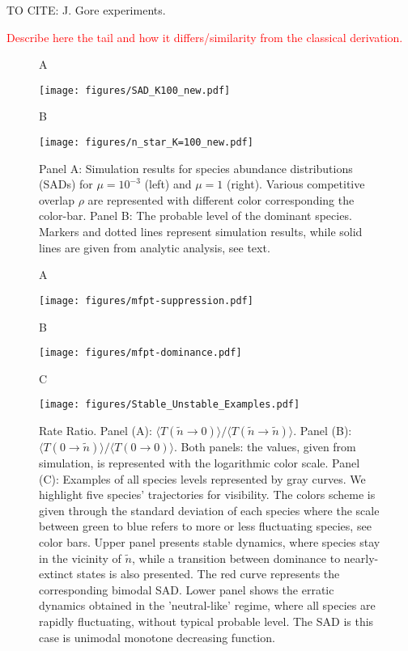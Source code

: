\documentclass[9pt,lineno]{elife}
\begin{document}
TO CITE: J. Gore experiments. 



\textcolor{red}{Describe here the tail and how it differs/similarity from the classical derivation.}


\begin{figure}
   \begin{flushleft}
        A
   \end{flushleft}
    \texttt{[image: figures/SAD\_K100\_new.pdf]}
    \begin{flushleft}
        B
   \end{flushleft}
    \texttt{[image: figures/n\_star\_K=100\_new.pdf]}
    \caption{Panel A: Simulation results for species abundance distributions (SADs) for $\mu=10^{-3}$ (left) and $\mu=1$ (right). Various competitive overlap $\rho$ are represented with different color corresponding the color-bar. Panel B: The probable level of the dominant species. Markers and dotted lines represent simulation results, while solid lines are given from analytic analysis, see text.         }
    \label{fig:my_label}
\end{figure}

\begin{figure}
    \centering
    \begin{flushleft}
        A
   \end{flushleft}
   \texttt{[image: figures/mfpt-suppression.pdf]}
   \begin{flushleft}
        B
   \end{flushleft}
    \texttt{[image: figures/mfpt-dominance.pdf]}
    \begin{flushleft}
        C
   \end{flushleft}
    \texttt{[image: figures/Stable\_Unstable\_Examples.pdf]}
    \caption{Rate Ratio. Panel (A):  $\langle T(\tilde{n}\rightarrow 0)\rangle/\langle T(\tilde{n}\rightarrow \tilde{n})\rangle $. Panel (B):  $\langle T(0\rightarrow \tilde{n})\rangle/\langle T(0\rightarrow 0)\rangle $. Both panels: the values, given from simulation, is represented with the logarithmic color scale. Panel (C): Examples of all species levels represented by gray curves.  We highlight five species' trajectories for visibility. The colors scheme is given through the standard deviation of each species where the scale between green to blue refers to more or less fluctuating species, see color bars. Upper panel presents stable dynamics, where species stay in the vicinity of $\tilde{n}$, while a transition between  dominance to nearly-extinct states is also presented. The red curve represents the corresponding bimodal SAD. Lower panel shows the erratic dynamics obtained in the 'neutral-like' regime, where all species are rapidly fluctuating, without typical probable level. The SAD is this case is unimodal monotone decreasing function.   }
    \label{fig:turnover}
\end{figure}
\end{document}
